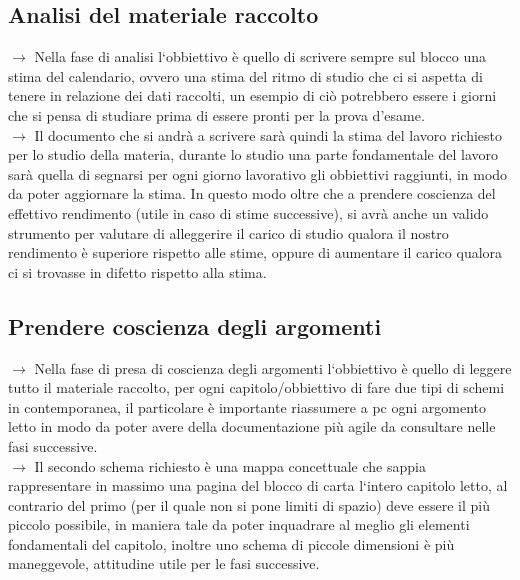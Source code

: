 \documentclass[11pt,a4paper]{article}
\begin{document}
\subsection{Analisi del materiale raccolto}
$\rightarrow$ Nella fase di analisi l`obbiettivo è quello di scrivere sempre sul blocco una stima del calendario, ovvero una stima del ritmo di studio che ci si aspetta di tenere in relazione dei dati raccolti, un esempio di ciò potrebbero essere i giorni che si pensa di studiare prima di essere pronti per la prova d'esame.\\
$\rightarrow$ Il documento che si andrà a scrivere sarà quindi la stima del lavoro richiesto per lo studio della materia, durante lo studio una parte fondamentale del lavoro sarà quella di segnarsi per ogni giorno lavorativo gli obbiettivi raggiunti, in modo da poter aggiornare la stima. In questo modo oltre che a prendere coscienza del effettivo rendimento (utile in caso di stime successive), si avrà anche un valido strumento per valutare di alleggerire il carico di studio qualora il nostro rendimento è superiore rispetto alle stime, oppure di aumentare il carico qualora ci si trovasse in difetto rispetto alla stima.\\

\subsection{Prendere coscienza degli argomenti}
$\rightarrow$ Nella fase di presa di coscienza degli argomenti l`obbiettivo è quello di leggere tutto il materiale raccolto, per ogni capitolo/obbiettivo di fare due tipi di schemi in contemporanea, il particolare è importante riassumere a pc ogni argomento letto in modo da poter avere della documentazione più agile da consultare nelle fasi successive.\\
$\rightarrow$ Il secondo schema richiesto è una mappa concettuale che sappia rappresentare in massimo una pagina del blocco di carta l`intero capitolo letto, al contrario del primo (per il quale non si pone limiti di spazio) deve essere il più piccolo possibile, in maniera tale da poter inquadrare al meglio gli elementi fondamentali del capitolo, inoltre uno schema di piccole dimensioni è più maneggevole, attitudine utile per le fasi successive.\\
\end{document}
